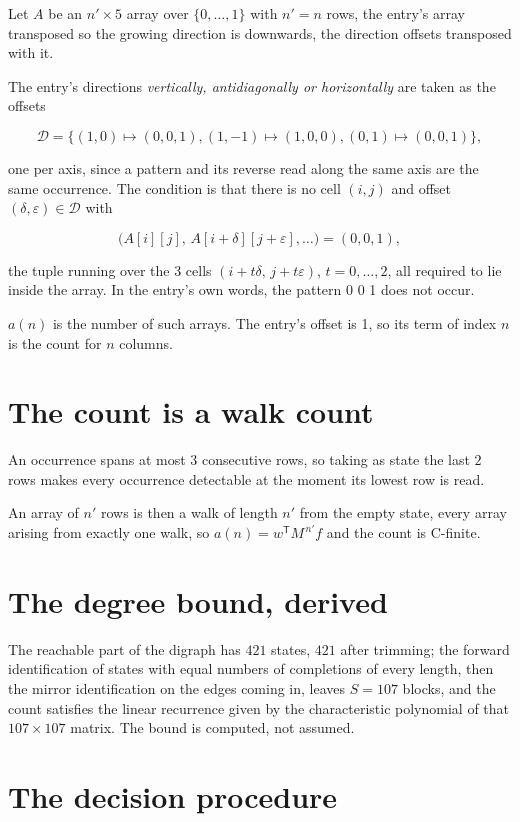 \documentclass[11pt]{article}
\theoremstyle{definition}
\begin{document}
Let $A$ be an $n' \times 5$ array over $\{0,\dots,1\}$ with $n' = n$ rows, the entry's array transposed so the growing direction is downwards, the direction offsets transposed with it.

The entry's directions {\itshape vertically, antidiagonally or horizontally} are taken as the offsets

\[\mathcal{D} = \{(1,0)\mapsto(0,0,1), (1,-1)\mapsto(1,0,0), (0,1)\mapsto(0,0,1)\},\]

one per axis, since a pattern and its reverse read along the same axis are the same occurrence. The condition is that there is no cell $(i,j)$ and offset $(\delta,\varepsilon)\in\mathcal{D}$ with

\[\bigl(A[i][j],\,A[i{+}\delta][j{+}\varepsilon],\dots\bigr) = (0, 0, 1),\]

the tuple running over the $3$ cells $(i+t\delta,\,j+t\varepsilon)$, $t = 0,\dots,2$, all required to lie inside the array. In the entry's own words, the pattern 0 0 1 does not occur.

$a(n)$ is the number of such arrays. The entry's offset is 1, so its term of index $n$ is the count for $n$ columns.

\section{The count is a walk count}

An occurrence spans at most $3$ consecutive rows, so taking as state the last $2$ rows makes every occurrence detectable at the moment its lowest row is read.

An array of $n'$ rows is then a walk of length $n'$ from the empty state, every array arising from exactly one walk, so $a(n) = w^{\mathsf T}M^{\,n'}f$ and the count is C-finite.

\section{The degree bound, derived}

The reachable part of the digraph has $421$ states, $421$ after trimming; the forward identification of states with equal numbers of completions of every length, then the mirror identification on the edges coming in, leaves $S = 107$ blocks, and the count satisfies the linear recurrence given by the characteristic polynomial of that $107\times107$ matrix. The bound is computed, not assumed.

\section{The decision procedure}
\end{document}
